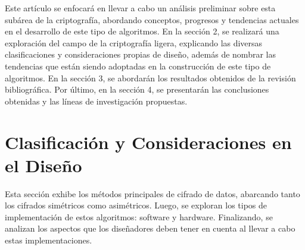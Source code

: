 \documentclass[a4paper,10pt]{article}
\begin{document}
	Este artículo se enfocará en llevar a cabo un análisis preliminar sobre esta subárea de la criptografía, abordando conceptos, progresos y tendencias actuales en el desarrollo de este tipo de algoritmos. En la sección 2, se realizará una exploración del campo de la criptografía ligera, explicando las diversas clasificaciones y consideraciones propias de diseño, además de nombrar las tendencias que están siendo adoptadas en la construcción de este tipo de algoritmos. En la sección 3, se abordarán los resultados obtenidos de la revisión bibliográfica. Por último, en la sección 4, se presentarán las conclusiones obtenidas y las líneas de investigación propuestas.
	
	\section{Clasificación y Consideraciones en el Diseño}
	\label{seccion2}
	Esta sección exhibe los métodos principales de cifrado de datos, abarcando tanto los cifrados simétricos como asimétricos. Luego, se exploran los tipos de implementación de estos algoritmos: software y hardware. Finalizando, se analizan los aspectos que los diseñadores deben tener en cuenta al llevar a cabo estas implementaciones.
	
\end{document}
